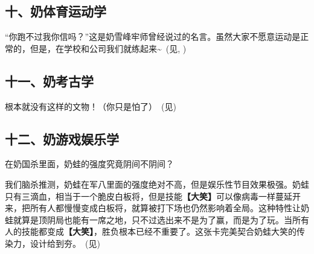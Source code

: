 

\clearpage
\subsection{十、奶体育运动学}

“你跑不过我你信吗？”这是奶雪峰牢师曾经说过的名言。虽然大家不愿意运动是正常的，但是，在学校和公司我们就练起来\textasciitilde{}~(见, )





\subsection{十一、奶考古学}

根本就没有这样的文物！（你只是怕了）~(见)



\clearpage
\subsection{十二、奶游戏娱乐学}

在奶国杀里面，奶蛙的强度究竟阴间不阴间？

我们脑杀推测，奶蛙在军八里面的强度绝对不高，但是娱乐性节目效果极强。奶蛙只有三滴血，相当于一个脆皮白板将，但是技能\textbf{【大笑】}可以像病毒一样蔓延开来，把所有人都慢慢变成白板将，就算被打下场也仍然影响着全局。这种特性让奶蛙就算是顶阴局也能有一席之地，只不过选出来不是为了赢，而是为了玩。当所有人的技能都变成\textbf{【大笑】}，胜负根本已经不重要了。这张卡完美契合奶蛙大笑的传染力，设计给到夯。~(见)


